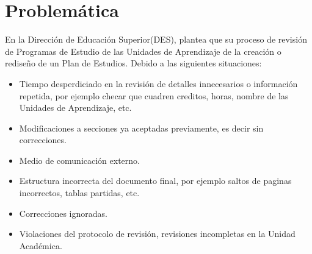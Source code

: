 \section{Problemática}
En la Dirección de Educación Superior(DES), plantea que su proceso de revisión de Programas de Estudio de las Unidades de Aprendizaje de la creación o rediseño de un Plan de Estudios. Debido a las siguientes situaciones:\\
\begin{itemize}
    \item Tiempo desperdiciado en la revisión de detalles innecesarios o información repetida, por ejemplo checar que cuadren creditos, horas, nombre de las Unidades de Aprendizaje, etc.
    \item Modificaciones a secciones ya aceptadas previamente, es decir sin correcciones.
    \item Medio de comunicación externo.
    \item Estructura incorrecta del documento final, por ejemplo saltos de paginas incorrectos, tablas partidas, etc.
    \item Correcciones ignoradas.
    \item Violaciones del protocolo de revisión, revisiones incompletas en la Unidad Académica.
\end{itemize}